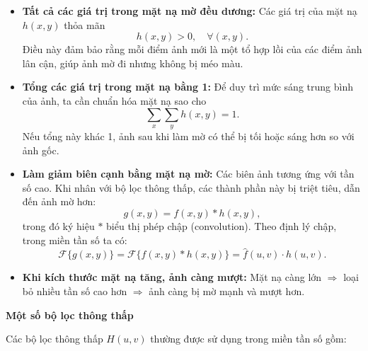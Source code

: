 \documentclass[12pt,a4paper]{report}
\numberwithin{equation}{section}
\theoremstyle{definition} %
\begin{document}
\begin{itemize}
	\item \textbf{Tất cả các giá trị trong mặt nạ mờ đều dương:}  
	Các giá trị của mặt nạ $h(x,y)$ thỏa mãn 
	\[
	h(x,y) > 0, \quad \forall (x,y).
	\]
	Điều này đảm bảo rằng mỗi điểm ảnh mới là một tổ hợp lồi của các điểm ảnh lân cận, giúp ảnh mờ đi nhưng không bị méo màu.

	\item \textbf{Tổng các giá trị trong mặt nạ bằng 1:}  
	Để duy trì mức sáng trung bình của ảnh, ta cần chuẩn hóa mặt nạ sao cho
	\[
	\sum_{x}\sum_{y} h(x,y) = 1.
	\]
	Nếu tổng này khác 1, ảnh sau khi làm mờ có thể bị tối hoặc sáng hơn so với ảnh gốc.

	\item \textbf{Làm giảm biên cạnh bằng mặt nạ mờ:}  
	Các biên ảnh tương ứng với tần số cao. Khi nhân với bộ lọc thông thấp, các thành phần này bị triệt tiêu, dẫn đến ảnh mờ hơn:
	\[
	g(x,y) = f(x,y) * h(x,y),
	\]
	trong đó ký hiệu $*$ biểu thị phép chập (convolution). Theo định lý chập, trong miền tần số ta có:
	\[
	\mathcal{F}\{g(x,y)\} = \mathcal{F}\{f(x,y)*h(x,y)\} = \hat{f}(u,v)\cdot\hat{h}(u,v).
	\]

	\item \textbf{Khi kích thước mặt nạ tăng, ảnh càng mượt:}  
	Mặt nạ càng lớn $\Rightarrow$ loại bỏ nhiều tần số cao hơn $\Rightarrow$ ảnh càng bị mờ mạnh và mượt hơn.
\end{itemize}

\begin{center}
\textbf{Một số bộ lọc thông thấp}
\end{center}
Các bộ lọc thông thấp $H(u,v)$ thường được sử dụng trong miền tần số gồm:
\end{document}
